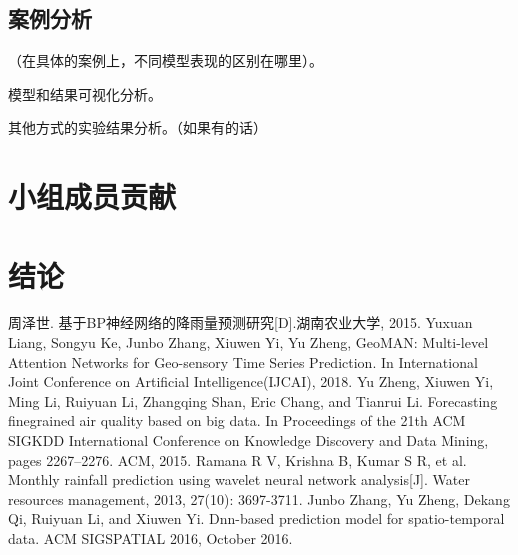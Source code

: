 \documentclass[UTF8]{ctexart}
\begin{document}
\subsection{案例分析}
（在具体的案例上，不同模型表现的区别在哪里）。

模型和结果可视化分析。

其他方式的实验结果分析。（如果有的话）


\section{小组成员贡献}

\section{结论}

\begin{thebibliography}{20}
   周泽世. 基于BP神经网络的降雨量预测研究[D].湖南农业大学, 2015.
	 Yuxuan Liang, Songyu Ke, Junbo Zhang, Xiuwen Yi, Yu Zheng, GeoMAN: Multi-level Attention Networks
  for Geo-sensory Time Series Prediction. In International Joint Conference on Artificial Intelligence(IJCAI), 2018.
   Yu Zheng, Xiuwen Yi, Ming Li, Ruiyuan Li, Zhangqing Shan, Eric Chang, and Tianrui Li. Forecasting finegrained air quality based on big data. In Proceedings of the 21th ACM SIGKDD International Conference
  on Knowledge Discovery and Data Mining, pages 2267–2276. ACM, 2015.
   Ramana R V, Krishna B, Kumar S R, et al. Monthly rainfall prediction using wavelet neural network
  analysis[J]. Water resources management, 2013, 27(10): 3697-3711.
   Junbo Zhang, Yu Zheng, Dekang Qi, Ruiyuan Li, and Xiuwen Yi. Dnn-based prediction model
  for spatio-temporal data. ACM SIGSPATIAL 2016, October 2016.
\end{thebibliography}
\end{document}
